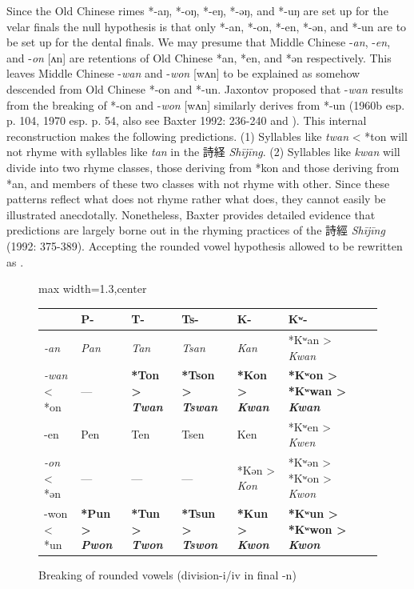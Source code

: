 Since the Old Chinese rimes *-aŋ, *-oŋ, *-eŋ, *-əŋ, and *-uŋ are set up
for the velar finals the null hypothesis is that only *-an, *-on, *-en,
*-ən, and *-un are to be set up for the dental finals. We may presume
that Middle Chinese -\emph{an}, -\emph{en}, and -\emph{on} {[}ʌn] are
retentions of Old Chinese *an, *en, and *ən respectively. This leaves
Middle Chinese -\emph{wan} and -\emph{won} {[}wʌn] to be explained as
somehow descended from Old Chinese *-on and *-un. Jaxontov proposed that
-\emph{wan} results from the breaking of *-on and -\emph{won} {[}wʌn]
similarly derives from *-un (1960b esp. p. 104, 1970 esp. p. 54, also
see Baxter 1992: 236-240 and \cite[203-207]{Baxter2014OldChinese}). This
internal reconstruction makes the following predictions. (1) Syllables
like \emph{twan} \textless{} *ton will not rhyme with syllables like
\emph{tan} in the 詩経  \emph{Shījīng}. (2) Syllables like \emph{kwan}
will divide into two rhyme classes, those deriving from *kon and those
deriving from *{}an, and members of these two classes with not rhyme
with other. Since these patterns reflect what does not rhyme rather what
does, they cannot easily be illustrated anecdotally. Nonetheless, Baxter
provides detailed evidence that predictions are largely borne out in the
rhyming practices of the 詩經  \emph{Shījīng} (1992: 375-389). Accepting
the rounded vowel hypothesis allowed to be rewritten as .

\begin{figure}
    \begin{adjustbox}{max width=1.3\textwidth,center}
\begin{tabular}{|l|l|l|l|l|l|l|l|}
 \hline
&
P- &
T- &
Ts- &
K- &
Kʷ- \\ \hline
{\emph{-an}} &
{\emph{Pan}} &
{\emph{Tan}} &
{\emph{Tsan}} &
{\emph{Kan}} &
*Kʷan > {\emph{Kwan}} \\ \hline
{\emph{-wan}} < *on &
--- &
\textbf{*Ton > {\emph{Twan}}} &
\textbf{*Tson > {\emph{Tswan}}} &
\textbf{*Kon > {\emph{Kwan}}} &
\textbf{*Kʷon > *Kʷwan > {\emph{Kwan}}} \\ \hline
-en &
Pen &
Ten &
Tsen &
Ken &
*Kʷen > {\emph{Kwen}} \\ \hline
{\emph{-on}} < *ən &
--- &
--- &
--- &
*Kən > {\emph{Kon}} &
*Kʷən > *Kʷon > {\emph{Kwon}} \\ \hline
-won < *un &
\textbf{*Pun > {\emph{Pwon}}} &
\textbf{*Tun > {\emph{Twon}}} &
\textbf{*Tsun > {\emph{Tswon}}} &
\textbf{*Kun > {\emph{Kwon}}} &
\textbf{*Kʷun > *Kʷwon > {\emph{Kwon}}} \\ \hline
\end{tabular}
\end{adjustbox}
    \caption{Breaking of rounded vowels (division-i/iv in final -n)}
    \label{fig:breaking-vowels}
\end{figure}

